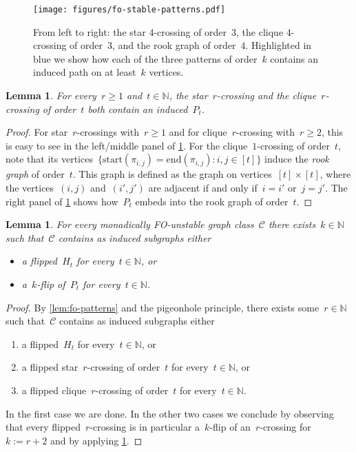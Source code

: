 \documentclass[11pt]{article}      \usepackage[margin=1in]{geometry}  \usepackage{microtype}
\newtheorem{lemma}[theorem]{Lemma}
\theoremstyle{definition}
\newcommand{\N}[0]{\mathrm{\mathbb{N}}}
\newcommand{\Start}{\mathrm{start}}
\newcommand{\End}{\mathrm{end}}
\newcommand{\CC}{\mathcal{C}}
\renewcommand{\ge}{\geqslant}
\renewcommand{\geq}{\ge}
\begin{document}
\begin{figure}[htbp]
  \centering
  \texttt{[image: figures/fo-stable-patterns.pdf]}
  \caption{From left to right: the star 4-crossing of order~$3$,
  the clique 4-crossing of order~$3$, and the rook graph of order~$4$.
  Highlighted in blue we show how each of the three patterns of order~$k$ contains an induced path on at least~$k$ vertices.
  }
  \label{fig:fo-patterns}
\end{figure}

\begin{lemma}\label{lem:crossing-to-path}
  For every~$r\geq 1$ and~$t \in \N$, the star~$r$-crossing and the clique~$r$-crossing of order~$t$ both contain an induced~$P_t$.
\end{lemma}
\begin{proof}
  For star~$r$-crossings with~$r \geq 1$ and for clique~$r$-crossing with~$r\geq 2$, this is easy to see in the left/middle panel of \cref{fig:fo-patterns}.
  For the clique~$1$-crossing of order~$t$, note that its vertices~$\{\Start(\pi_{i,j}) = \End(\pi_{i,j}) : i,j \in [t]\}$ induce the \emph{rook graph} of order~$t$. 
  This graph is defined as the graph on vertices~$[t] \times [t]$, where the vertices~$(i,j)$ and~$(i',j')$ are adjacent if and only if~$i = i'$ or~$j = j'$.
  The right panel of \cref{fig:fo-patterns} shows how~$P_t$ embeds into the rook graph of order~$t$.
\end{proof}

\begin{lemma}\label{lem:fo-unstable-to-ideal-patterns}
  For every monadically FO-unstable graph class~$\CC$ there exists~$k\in\N$ such that~$\CC$ contains as induced subgraphs either
  \begin{itemize}
    \item a flipped~$H_t$ for every~$t\in\N$, or
    \item a~$k$-flip of~$P_t$ for every~$t \in \N$.
  \end{itemize}
\end{lemma}
\begin{proof}
  By \cref{lem:fo-patterns} and the pigeonhole principle, there exists some~$r \in \N$ such that~$\CC$ contains as induced subgraphs either
  \begin{enumerate}
    \item a flipped~$H_t$ for every~$t\in\N$, or
    \item a flipped star~$r$-crossing of order~$t$ for every~$t\in\N$, or
    \item a flipped clique~$r$-crossing of order~$t$ for every~$t\in\N$.
  \end{enumerate}
  In the first case we are done.
  In the other two cases we conclude by observing that every flipped~$r$-crossing is in particular a~$k$-flip of an~$r$-crossing for~$k := r +2$ and by applying \cref{lem:crossing-to-path}.
\end{proof}
\end{document}
